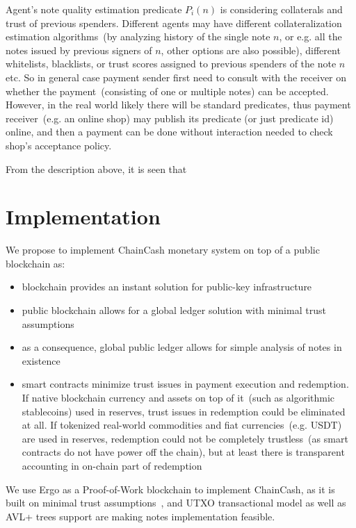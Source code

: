 \documentclass{llncs}   %
\newcommand{\cc}{ChainCash}
\begin{document}
Agent's note quality estimation predicate $P_i(n)$ is considering collaterals and trust of previous spenders. Different agents may have different 
collateralization estimation algorithms~(by analyzing history of the single note $n$, or e.g. all the notes issued by previous signers of $n$, other options are also possible), different whitelists, blacklists, or trust scores assigned to previous spenders of the note $n$ etc. So in general case payment sender first need to consult with the receiver on whether the payment~(consisting of one or multiple notes) can be accepted. However, in the real world likely there will be standard predicates, thus payment receiver~(e.g. an online shop) may publish its predicate (or just predicate id) online, and then a payment can be done without interaction needed to check shop's acceptance policy.

From the description above, it is seen that 

\section{Implementation}
\label{sec-impl}

We propose to implement \cc{} monetary system on top of a public blockchain as:

\begin{itemize}
  \item{} blockchain provides an instant solution for public-key infrastructure
  \item{} public blockchain allows for a global ledger solution with minimal trust assumptions~\cite{kya}
  \item{} as a consequence, global public ledger allows for simple analysis of notes in existence
  \item{} smart contracts minimize trust issues in payment execution and redemption. If native blockchain currency and assets on top of it~(such as algorithmic stablecoins) used in reserves, trust issues in redemption could be eliminated at all. If tokenized real-world commodities and fiat currencies~(e.g. USDT) are used in reserves, redemption could not be completely trustless~(as smart contracts do not have power off the chain), but at least there is transparent accounting in on-chain part of redemption
\end{itemize}

We use Ergo as a Proof-of-Work blockchain to implement \cc{}, as it is built on minimal trust assumptions~\cite{kya}, and UTXO transactional model as well as AVL+ trees support are making notes implementation feasible.
\end{document}

